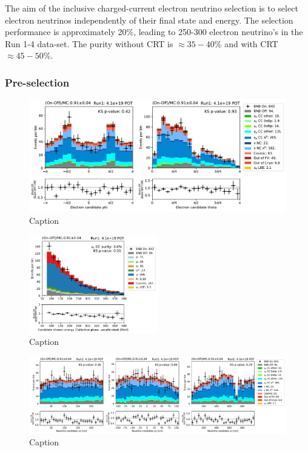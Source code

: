 \label{sec:nueselection:inclusive}

The aim of the inclusive charged-current electron neutrino selection is to select electron neutrinos independently of their final state and energy. The selection performance is approximately 20\%, leading to 250-300 electron neutrino's in the Run 1-4 data-set. The purity without CRT is $\approx 35-40\%$ and with CRT $\approx 45-50\%$.

\subsubsection{Pre-selection}

\begin{figure}
    \centering
    \includegraphics[width=\textwidth]{NueCCsel/Images/run1/pre_angles.pdf}
    \caption{Caption}
    \label{fig:pre_shower_E_pdg}
\end{figure}

\begin{figure}
    \centering
    \includegraphics[width=0.5\textwidth]{NueCCsel/Images/run1/pre_shower_E_pdg.pdf}
    \caption{Caption}
    \label{fig:pre_shower_E_pdg}
\end{figure}

\begin{figure}
    \centering
    \includegraphics[width=\textwidth]{NueCCsel/Images/run1/pre_vtx.pdf}
    \caption{Caption}
    \label{fig:pre_vtx}
\end{figure}


